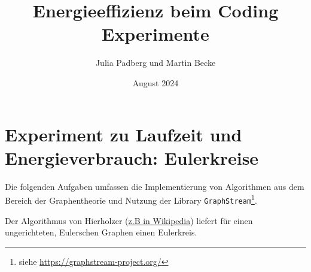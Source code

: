 \documentclass{article}
\title{Energieeffizienz beim Coding\\[2mm]Experimente}
\author{Julia Padberg und Martin Becke}
\date{August 2024}
\begin{document}
\maketitle

\section*{Experiment zu Laufzeit und Energieverbrauch: Eulerkreise}


Die folgenden Aufgaben umfassen die Implementierung von  Algorithmen aus dem Bereich der Graphentheorie und  Nutzung der Library \texttt{GraphStream}\footnote{%
   siehe  \href{https://graphstream-project.org/}{https://graphstream-project.org/}}.
	
	
	
   Der Algorithmus von Hierholzer (\href{https://de.wikipedia.org/wiki/Algorithmus_von_Hierholzer}{z.B in Wikipedia})  liefert für  einen ungerichteten, Eulerschen Graphen einen Eulerkreis. 
	
	
	
\end{document}
